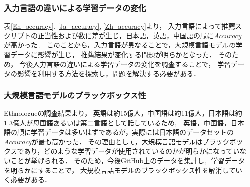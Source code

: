   \subsubsection{入力言語の違いによる学習データの変化}
    表\ref{En_accuracy}, \ref{Ja_accuracy}, \ref{Zh_accuracy}より，
    入力言語によって推薦スクリプトの正当性および数に差が生じ，日本語，英語，中国語の順に$Accuracy$が高かった．
    このことから，入力言語が異なることで，大規模言語モデルの学習データに影響が生じ，
    推薦結果が変化する問題が明らかとなった．
    そのため，%
    今後入力言語の違いによる学習データの変化を調査することで，
    学習データの影響を利用する方法を探索し，問題を解決する必要がある．


  \subsubsection{大規模言語モデルのブラックボックス性}
    Ethnologueの調査結果\cite{Ethnologue}より，
    英語は約15億人，中国語は約11億人，日本語は約1.3億人が母国語あるいは第二言語として話しているため，
    英語，中国語，日本語の順に学習データは多いはずであるが，実際には日本語のデータセットの$Accuracy$が最も高かった．
    その理由として，大規模言語モデルはブラックボックスであり，どのような学習データが使用されているのかが明らかになっていないことが挙げられる．
    そのため，今後GitHub上のデータを集計し，学習データを明らかにすることで，
    大規模言語モデルのブラックボックス性を解消していく必要がある．
    